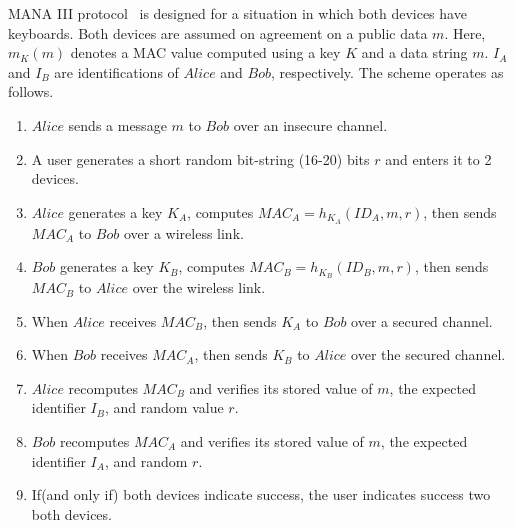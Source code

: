 MANA III protocol~\cite{Mitchell:2004p25948} is designed for a situation in which both devices have keyboards. Both devices are assumed on agreement on a public data $m$. Here, $m_K(m)$ denotes a MAC value computed using a key $K$ and a data string $m$. $I_A$ and $I_B$ are identifications of $Alice$ and $Bob$, respectively. The scheme operates as follows. 

\begin{enumerate}
\item $Alice$ sends a message $m$ to $Bob$ over an insecure channel. 
\item A user generates a short random bit-string (16-20) bits $r$ and enters it to 2 devices.
\item $Alice$ generates a key $K_A$, computes $MAC_A = h_{K_A}(ID_A,m,r)$, then sends $MAC_A$ to $Bob$ over a wireless link.
\item $Bob$ generates a key $K_B$, computes $MAC_B = h_{K_B}(ID_B,m,r)$, then sends $MAC_B$ to $Alice$ over the wireless link.
\item When $Alice$ receives $MAC_B$, then sends $K_A$ to $Bob$ over a secured channel.
\item When $Bob$ receives $MAC_A$, then sends $K_B$ to $Alice$ over the secured channel.
\item $Alice$ recomputes $MAC_B$ and verifies its stored value of $m$, the expected identifier $I_B$, and random value $r$.
\item $Bob$ recomputes $MAC_A$ and verifies its stored value of $m$, the expected identifier $I_A$, and random $r$.
\item If(and only if) both devices indicate success, the user indicates success two both devices.
\end{enumerate}


